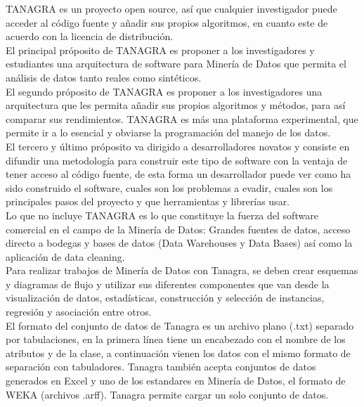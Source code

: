 TANAGRA es un proyecto open source, as\'i que cualquier investigador puede acceder al c\'odigo fuente y a\~nadir
sus propios algoritmos, en cuanto este de acuerdo con la licencia de distribuci\'on.\\

El principal pr\'oposito de TANAGRA es proponer a los investigadores y estudiantes una arquitectura de software
para Miner\'ia de Datos que permita el an\'alisis de datos tanto reales como sint\'eticos.\\

El segundo pr\'oposito de TANAGRA es proponer a los investigadores una arquitectura que les permita a\~nadir sus
propios algoritmos y m\'etodos, para as\'i comparar sus rendimientos. TANAGRA es m\'as una plataforma
experimental, que permite ir a lo esencial y obviarse la programaci\'on del manejo de los datos.\\

El tercero y \'ultimo pr\'oposito va dirigido a desarrolladores novatos y consiste en difundir una metodolog\'ia
para construir este tipo de software con la ventaja de tener acceso al c\'odigo fuente, de esta forma un
desarrollador puede ver como ha sido construido el software, cuales son los problemas a evadir, cuales son los
principales pasos del proyecto y que herramientas y librer\'ias usar.\\

Lo que no incluye TANAGRA es lo que constituye la fuerza del software comercial en el campo de la Miner\'ia de
Datos: Grandes fuentes de datos, acceso directo a bodegas y bases de datos (Data Warehouses y Data Bases) as\'i
como la aplicaci\'on de data cleaning.\\

Para realizar trabajos de Miner\'ia de Datos con Tanagra, se deben crear esquemas y diagramas de flujo y utilizar
sus diferentes componentes que van desde la visualizaci\'on de datos, estad\'isticas, construcci\'on y
selecci\'on de ins\-tancias, regresi\'on y asociaci\'on entre otros.\\

El formato del conjunto de datos de Tanagra es un archivo plano (.txt) separado por tabulaciones, en la primera
l\'inea tiene un encabezado con el nombre de los atributos y de la clase, a continuaci\'on vienen los datos con
el mismo formato de separaci\'on con tabuladores. Tanagra tambi\'en acepta conjuntos de datos generados en Excel
y uno de los estandares en Miner\'ia de Datos, el formato de WEKA (archivos .arff). Tanagra permite cargar un
solo conjunto de datos.\\

